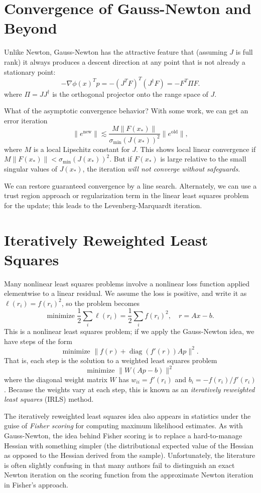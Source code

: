 \documentclass[12pt, leqno]{article} %
\begin{document}
\section*{Convergence of Gauss-Newton and Beyond}

Unlike Newton, Gauss-Newton has the attractive feature that (assuming
$J$ is full rank) it always produces a descent direction at any point
that is not already a stationary point:
\[
  -\nabla \phi(x)^T p = -(J^T F)^T (J^\dagger F) = -F^T \Pi F.
\]
where $\Pi = J J^\dagger$ is the orthogonal projector onto the range
space of $J$.

What of the asymptotic convergence behavior?  With some work,
we can get an error iteration
\[
  \|e^{\mathrm{new}}\| \lesssim \frac{M
    \|F(x_*)\|}{\sigma_{\min}(J(x_*))^2} \|e^{\mathrm{old}}\|,
\]
where $M$ is a local Lipschitz constant for $J$.  This shows local
linear convergence if $M \|F(x_*)\| < \sigma_{\min}(J(x_*))^2$.  But
if $F(x_*)$ is large relative to the small singular values of
$J(x_*)$, the iteration {\em will not converge without safeguards}.

We can restore guaranteed convergence by a line search.  Alternately,
we can use a trust region approach or regularization term in the
linear least squares problem for the update; this leads to the
Levenberg-Marquardt iteration.

\section*{Iteratively Reweighted Least Squares}

Many nonlinear least squares problems involve a nonlinear loss
function applied elementwise to a linear residual.  We assume
the loss is positive, and write it as $\ell(r_i) = f(r_i)^2$,
so the problem becomes
\[
\mbox{minimize } \frac{1}{2} \sum_i \ell(r_i)
= \frac{1}{2} \sum_i f(r_i)^2, \quad r = Ax-b.
\]
This is a nonlinear least squares problem; if we apply the
Gauss-Newton idea, we have steps of the form
\[
  \mbox{minimize } \|f(r) + \operatorname{diag}(f'(r)) A p\|^2.
\]
That is, each step is the solution to a weighted least squares problem
\[
  \mbox{minimize } \|W(Ap-b)\|^2
\]
where the diagonal weight matrix $W$ has $w_{ii} = f'(r_i)$ and
$b_i = -f(r_i)/f'(r_i)$.  Because the weights vary at each step,
this is known as an {\em iteratively reweighted least squares} (IRLS)
method.

The iteratively reweighted least squares idea also appears in
statistics under the guise of {\em Fisher scoring} for computing
maximum likelihood estimates.  As with Gauss-Newton, the idea behind
Fisher scoring is to replace a hard-to-manage Hessian with something
simpler (the distributional expected value of the Hessian as opposed
to the Hessian derived from the sample).  Unfortunately, the
literature is often slightly confusing in that many authors fail to
distinguish an exact Newton iteration on the scoring function
from the approximate Newton iteration in Fisher's approach.
\end{document}
